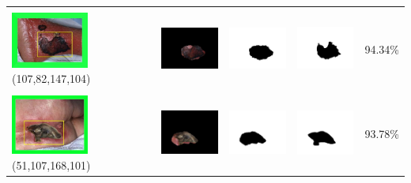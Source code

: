 \begin{table}[H]
\begin{tabular}{|m{1.0in}|m{1.0in}|m{1.0in}|m{1.0in}|m{0.6in}|}
		&  &  & \\
		\includegraphics[width=1.0in]{gambar/hasil_segmentasi/luka_hitam/image_19_rect.jpg} {\centering\fontsize{10}{10}\selectfont(107,82,147,104)}&
		\includegraphics[width=1.0in]{gambar/hasil_segmentasi/luka_hitam/result_19.jpg}&
		\includegraphics[width=1.0in]{gambar/hasil_segmentasi/luka_hitam/mask_r_19.jpg}&
		\includegraphics[width=1.0in]{gambar/hasil_segmentasi/luka_hitam/19_r.jpg}&
		94.34\% \\
		\hline
		
		&  &  & \\
		\includegraphics[width=1.0in]{gambar/hasil_segmentasi/luka_hitam/image_20_rect.jpg} {\centering\fontsize{10}{10}\selectfont(51,107,168,101)}&
		\includegraphics[width=1.0in]{gambar/hasil_segmentasi/luka_hitam/result_20.jpg}&
		\includegraphics[width=1.0in]{gambar/hasil_segmentasi/luka_hitam/mask_r_20.jpg}&
		\includegraphics[width=1.0in]{gambar/hasil_segmentasi/luka_hitam/20_r.jpg}&
		93.78\% \\
		\hline
		

\end{tabular}
\end{table}
